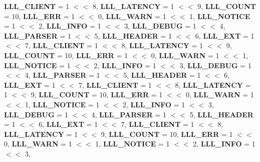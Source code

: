 \begin{DoxyCompactItemize}
{\bfseries L\+L\+L\+\_\+\+C\+L\+I\+E\+NT} = 1 $<$$<$ 8, 
{\bfseries L\+L\+L\+\_\+\+L\+A\+T\+E\+N\+CY} = 1 $<$$<$ 9, 
{\bfseries L\+L\+L\+\_\+\+C\+O\+U\+NT} = 10, 
{\bfseries L\+L\+L\+\_\+\+E\+RR} = 1 $<$$<$ 0, 
\newline
{\bfseries L\+L\+L\+\_\+\+W\+A\+RN} = 1 $<$$<$ 1, 
{\bfseries L\+L\+L\+\_\+\+N\+O\+T\+I\+CE} = 1 $<$$<$ 2, 
{\bfseries L\+L\+L\+\_\+\+I\+N\+FO} = 1 $<$$<$ 3, 
{\bfseries L\+L\+L\+\_\+\+D\+E\+B\+UG} = 1 $<$$<$ 4, 
\newline
{\bfseries L\+L\+L\+\_\+\+P\+A\+R\+S\+ER} = 1 $<$$<$ 5, 
{\bfseries L\+L\+L\+\_\+\+H\+E\+A\+D\+ER} = 1 $<$$<$ 6, 
{\bfseries L\+L\+L\+\_\+\+E\+XT} = 1 $<$$<$ 7, 
{\bfseries L\+L\+L\+\_\+\+C\+L\+I\+E\+NT} = 1 $<$$<$ 8, 
\newline
{\bfseries L\+L\+L\+\_\+\+L\+A\+T\+E\+N\+CY} = 1 $<$$<$ 9, 
{\bfseries L\+L\+L\+\_\+\+C\+O\+U\+NT} = 10, 
{\bfseries L\+L\+L\+\_\+\+E\+RR} = 1 $<$$<$ 0, 
{\bfseries L\+L\+L\+\_\+\+W\+A\+RN} = 1 $<$$<$ 1, 
\newline
{\bfseries L\+L\+L\+\_\+\+N\+O\+T\+I\+CE} = 1 $<$$<$ 2, 
{\bfseries L\+L\+L\+\_\+\+I\+N\+FO} = 1 $<$$<$ 3, 
{\bfseries L\+L\+L\+\_\+\+D\+E\+B\+UG} = 1 $<$$<$ 4, 
{\bfseries L\+L\+L\+\_\+\+P\+A\+R\+S\+ER} = 1 $<$$<$ 5, 
\newline
{\bfseries L\+L\+L\+\_\+\+H\+E\+A\+D\+ER} = 1 $<$$<$ 6, 
{\bfseries L\+L\+L\+\_\+\+E\+XT} = 1 $<$$<$ 7, 
{\bfseries L\+L\+L\+\_\+\+C\+L\+I\+E\+NT} = 1 $<$$<$ 8, 
{\bfseries L\+L\+L\+\_\+\+L\+A\+T\+E\+N\+CY} = 1 $<$$<$ 9, 
\newline
{\bfseries L\+L\+L\+\_\+\+C\+O\+U\+NT} = 10, 
{\bfseries L\+L\+L\+\_\+\+E\+RR} = 1 $<$$<$ 0, 
{\bfseries L\+L\+L\+\_\+\+W\+A\+RN} = 1 $<$$<$ 1, 
{\bfseries L\+L\+L\+\_\+\+N\+O\+T\+I\+CE} = 1 $<$$<$ 2, 
\newline
{\bfseries L\+L\+L\+\_\+\+I\+N\+FO} = 1 $<$$<$ 3, 
{\bfseries L\+L\+L\+\_\+\+D\+E\+B\+UG} = 1 $<$$<$ 4, 
{\bfseries L\+L\+L\+\_\+\+P\+A\+R\+S\+ER} = 1 $<$$<$ 5, 
{\bfseries L\+L\+L\+\_\+\+H\+E\+A\+D\+ER} = 1 $<$$<$ 6, 
\newline
{\bfseries L\+L\+L\+\_\+\+E\+XT} = 1 $<$$<$ 7, 
{\bfseries L\+L\+L\+\_\+\+C\+L\+I\+E\+NT} = 1 $<$$<$ 8, 
{\bfseries L\+L\+L\+\_\+\+L\+A\+T\+E\+N\+CY} = 1 $<$$<$ 9, 
{\bfseries L\+L\+L\+\_\+\+C\+O\+U\+NT} = 10, 
\newline
{\bfseries L\+L\+L\+\_\+\+E\+RR} = 1 $<$$<$ 0, 
{\bfseries L\+L\+L\+\_\+\+W\+A\+RN} = 1 $<$$<$ 1, 
{\bfseries L\+L\+L\+\_\+\+N\+O\+T\+I\+CE} = 1 $<$$<$ 2, 
{\bfseries L\+L\+L\+\_\+\+I\+N\+FO} = 1 $<$$<$ 3, 
\newline

\end{DoxyCompactItemize}
